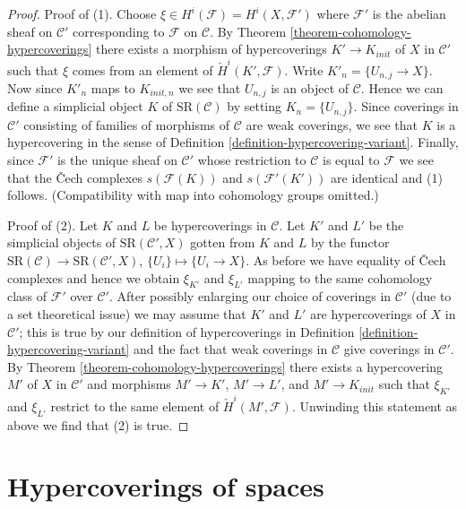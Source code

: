 \begin{proof}
\medskip\noindent
Proof of (1). Choose $\xi \in H^i(\mathcal{F}) = H^i(X, \mathcal{F}')$
where $\mathcal{F}'$ is the abelian sheaf on $\mathcal{C}'$ corresponding
to $\mathcal{F}$ on $\mathcal{C}$. By
Theorem \ref{theorem-cohomology-hypercoverings}
there exists a morphism of hypercoverings $K' \to K_{init}$
of $X$ in $\mathcal{C}'$ such that $\xi$ comes from an element
of $\check{H}^i(K', \mathcal{F})$.
Write $K'_n = \{U_{n, j} \to X\}$. Now since $K'_n$ maps to
$K_{init, n}$ we see that $U_{n, j}$ is an object of $\mathcal{C}$.
Hence we can define a simplicial object $K$ of $\text{SR}(\mathcal{C})$
by setting $K_n = \{U_{n, j}\}$. Since coverings in
$\mathcal{C}'$ consisting of families of morphisms of $\mathcal{C}$
are weak coverings, we see that $K$ is a hypercovering in the sense
of Definition \ref{definition-hypercovering-variant}.
Finally, since $\mathcal{F}'$ is the unique sheaf on $\mathcal{C}'$
whose restriction to $\mathcal{C}$ is equal to $\mathcal{F}$
we see that the {\v C}ech complexes $s(\mathcal{F}(K))$
and $s(\mathcal{F}'(K'))$ are identical and (1) follows.
(Compatibility with map into cohomology groups omitted.)

\medskip\noindent
Proof of (2). Let $K$ and $L$ be hypercoverings in $\mathcal{C}$.
Let $K'$ and $L'$ be the simplicial objects of $\text{SR}(\mathcal{C}', X)$
gotten from $K$ and $L$ by the functor
$\text{SR}(\mathcal{C}) \to \text{SR}(\mathcal{C}', X)$,
$\{U_i\} \mapsto \{U_i \to X\}$. As before we have equality of
{\v C}ech complexes and hence we obtain $\xi_{K'}$ and
$\xi_{L'}$ mapping to the same cohomology class of $\mathcal{F}'$
over $\mathcal{C}'$. After possibly enlarging our choice
of coverings in $\mathcal{C}'$ (due to a set theoretical issue)
we may assume that $K'$ and $L'$ are hypercoverings of $X$ in
$\mathcal{C}'$; this is true by our definition of hypercoverings in
Definition \ref{definition-hypercovering-variant} and
the fact that weak coverings in $\mathcal{C}$ give coverings in
$\mathcal{C}'$. By
Theorem \ref{theorem-cohomology-hypercoverings}
there exists a hypercovering $M'$ of $X$ in $\mathcal{C}'$
and morphisms $M' \to K'$, $M' \to L'$, and $M' \to K_{init}$
such that $\xi_{K'}$ and $\xi_{L'}$ restrict to the same element of
$\check{H}^i(M', \mathcal{F})$. Unwinding this statement as above
we find that (2) is true.
\end{proof}





\section{Hypercoverings of spaces}
\label{section-hypercoverings-spaces}

